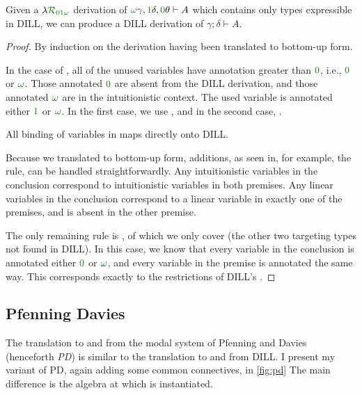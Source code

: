 \begin{proposition}
  Given a $\name_{\instDILL}$ derivation of
  $\gr\omega\gamma, \gr1\delta,
  \gr0\theta \vdash A$ which contains only types expressible
  in DILL, we can produce a DILL derivation of $\gamma; \delta \vdash A$.
\end{proposition}
\begin{proof}
  By induction on the derivation having been translated to bottom-up form.

  In the case of , all of the unused variables have annotation
  greater than $\gr0$, i.e., $\gr0$ or $\gr\omega$.
  Those annotated $\gr0$ are absent from the DILL derivation, and those
  annotated $\gr\omega$ are in the intuitionistic context.
  The used variable is annotated either $\gr1$ or $\gr\omega$.
  In the first case, we use , and in the second case,
  .

  All binding of variables in \name{} maps directly onto DILL\@.

  Because we translated to bottom-up form, additions, as seen in, for example,
  the  rule, can be handled straightforwardly.
  Any intuitionistic variables in the conclusion correspond to intuitionistic
  variables in both premises.
  Any linear variables in the conclusion correspond to a linear variable in
  exactly one of the premises, and is absent in the other premise.

  The only remaining rule is , of which we only cover
   (the other two targeting types not found
  in DILL).
  In this case, we know that every variable in the conclusion is annotated
  either $\gr0$ or $\gr\omega$, and every variable in the premise is
  annotated the same way.
  This corresponds exactly to the restrictions of DILL's .
\end{proof}

\subsection{Pfenning Davies}\label{sec:trans-pd}

The translation to and from the modal system of Pfenning and Davies
\cite{judgmental} (henceforth \emph{PD}) is similar to the translation to and
from DILL\@.
I present my variant of PD, again adding some common connectives, in
\cref{fig:pd}
The main difference is the algebra at which \name{} is instantiated.

